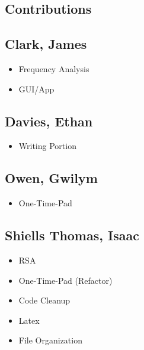 \documentclass[11pt]{article}
\begin{document}
\begin{multicols}{2}
\begin{spacing}{1.125}
		\section{Contributions}
		\subsection{Clark, James}
		\begin{itemize}
			\item Frequency Analysis
			\item GUI/App
		\end{itemize}
		\subsection{Davies, Ethan}
		\begin{itemize}
			\item Writing Portion
		\end{itemize}
		\subsection{Owen, Gwilym}
		\begin{itemize}
			\item One-Time-Pad
		\end{itemize}
		\subsection{Shiells Thomas, Isaac}
		\begin{itemize}
			\item RSA
			\item One-Time-Pad (Refactor)
			\item Code Cleanup
			\item Latex
			\item File Organization
		\end{itemize}

		\printbibliography

	\end{spacing}
\end{multicols}
\end{document}
